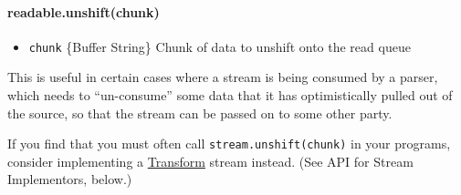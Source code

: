 \paragraph{readable.unshift(chunk)}\label{readable.unshiftchunk}

\begin{itemize}
\itemsep1pt\parskip0pt
\item
  \texttt{chunk} \{Buffer \textbar{} String\} Chunk of data to unshift
  onto the read queue
\end{itemize}

This is useful in certain cases where a stream is being consumed by a
parser, which needs to ``un-consume'' some data that it has
optimistically pulled out of the source, so that the stream can be
passed on to some other party.

If you find that you must often call \texttt{stream.unshift(chunk)} in
your programs, consider implementing a
\hyperref[streamux5fclassux5fstreamux5ftransform]{Transform} stream
instead. (See API for Stream Implementors, below.)

